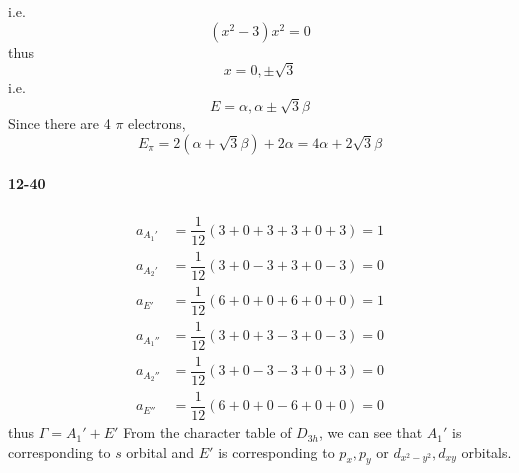 \documentclass[a4paper]{article}
\newcommand{\ex}[1]{\paragraph{12-#1}}
\numberwithin{equation}{section}
\begin{document}
i.e.
\begin{equation}\label{key}
(x^2 - 3)x^2 = 0
\end{equation}
thus
\begin{equation}\label{key}
x = 0, \pm \sqrt{3}
\end{equation}
i.e.
\begin{equation}\label{key}
E = \alpha, \alpha\pm\sqrt{3}\beta
\end{equation}
Since there are 4 $ \pi $ electrons, 
\begin{equation}\label{key}
E_\pi = 2(\alpha+\sqrt{3}\beta) + 2\alpha  = 4\alpha + 2\sqrt{3}\beta
\end{equation}

\ex{40}
\begin{align}
a_{A_1'} &= \dfrac{1}{12}(3 + 0 + 3 +3 + 0 + 3) = 1\\
a_{A_2'} &= \dfrac{1}{12}(3 + 0 - 3 +3 + 0 - 3) = 0\\
a_{E'} &= \dfrac{1}{12}(6 + 0 + 0 + 6 + 0 + 0) = 1\\
a_{A_1''} &= \dfrac{1}{12}(3 + 0 + 3 -3 + 0 - 3) = 0\\
a_{A_2''} &= \dfrac{1}{12}(3 + 0 - 3 -3 + 0 + 3) = 0\\
a_{E''} &= \dfrac{1}{12}(6 + 0 + 0 -6 + 0 + 0) = 0
\end{align}
thus
$ \Gamma = A_1' + E' $
From the character table of $ D_{3h} $, we can see that $ A_1' $ is corresponding to $ s $ orbital and $ E' $ is corresponding to $ p_x,p_y $ or $ d_{x^2-y^2},d_{xy} $ orbitals.
\end{document}
